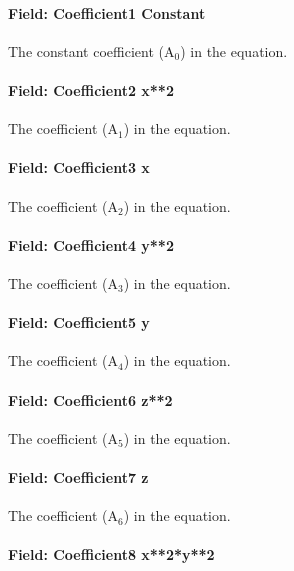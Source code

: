 \paragraph{Field: Coefficient1 Constant}\label{field-coefficient1-constant-10}

The constant coefficient (A\(_{0}\)) in the equation.

\paragraph{Field: Coefficient2 x**2}\label{field-coefficient2-x2}

The coefficient (A\(_{1}\)) in the equation.

\paragraph{Field: Coefficient3 x}\label{field-coefficient3-x-1}

The coefficient (A\(_{2}\)) in the equation.

\paragraph{Field: Coefficient4 y**2}\label{field-coefficient4-y2}

The coefficient (A\(_{3}\)) in the equation.

\paragraph{Field: Coefficient5 y}\label{field-coefficient5-y-1}

The coefficient (A\(_{4}\)) in the equation.

\paragraph{Field: Coefficient6 z**2}\label{field-coefficient6-z2}

The coefficient (A\(_{5}\)) in the equation.

\paragraph{Field: Coefficient7 z}\label{field-coefficient7-z}

The coefficient (A\(_{6}\)) in the equation.

\paragraph{Field: Coefficient8 x**2*y**2}\label{field-coefficient8-x2y2}

